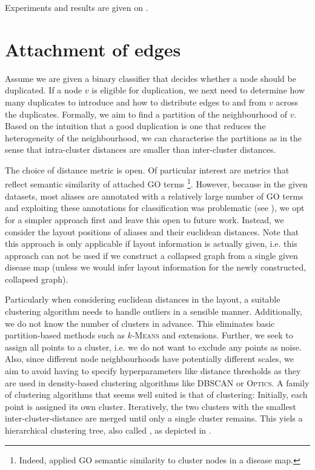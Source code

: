 \documentclass[
	fontsize=10pt, %
	twoside=false, %
	secnumdepth=1, %
  toc=indentunnumbered %
]{kaobook}
\begin{document}
Experiments and results are given on .


\section{Attachment of edges}
\label{sec:edge attachment}


Assume we are given a binary classifier that decides whether a node should be
duplicated. If a node $v$ is eligible for duplication, we next need to determine
how many duplicates to introduce and how to distribute edges to and from $v$
across the duplicates. Formally, we aim to find a partition of the neighbourhood
of $v$. Based on the intuition that a good duplication is one that reduces the
heterogeneity of the neighbourhood, we can characterise the partitions as
 in the sense that intra-cluster distances are smaller than
inter-cluster distances.

The choice of distance metric is open. Of particular interest are metrics that
reflect semantic similarity of attached GO terms \footnote{ Indeed,
  \citeauthor{ostaszewski_ClusteringApproachesVisual_2018} applied GO semantic
  similarity to cluster nodes in a disease map. }. However, because in the given
datasets, most aliases are annotated with a relatively large number of GO terms
and exploiting these annotations for classification was problematic (see ),
we opt for a
simpler approach first and leave this open to future work. %
Instead, we consider the layout positions of aliases and their euclidean
distances. Note that this approach is only applicable if layout information is
actually given, i.e. this approach can not be used if we construct a collapsed
graph from a single given disease map (unless we would infer layout information
for the newly constructed, collapsed graph).

Particularly when considering euclidean distances in the layout, a suitable
clustering algorithm needs to handle outliers in a sensible manner.
Additionally, we do not know the number of clusters in advance. This eliminates
basic partition-based methods such as $k$-\textsc{Means} and extensions.
%
Further, we seek to assign all points to a cluster, i.e. we do not want to
exclude any points as noise. Also, since different node neighbourhoods have
potentially different scales, we aim to avoid having to specify hyperparameters
like distance thresholds as they are used in density-based clustering algorithms
like \textsc{DBSCAN} or \textsc{Optics}.
%
A family of clustering algorithms that seems well suited is that of
 clustering: Initially, each point is assigned its own
cluster. Iteratively, the two clusters with the smallest inter-cluster-distance
are merged until only a single cluster remains. This yiels a hierarchical
clustering tree, also called , as depicted in
.
\end{document}
